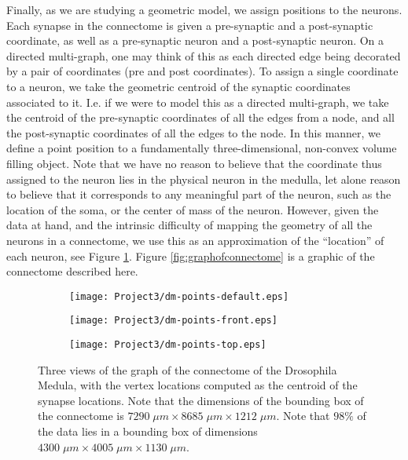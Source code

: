 \documentclass[11]{article}
\theoremstyle{remark}
\theoremstyle{definition}
\begin{document}
Finally, as we are studying a geometric model, we assign positions to the neurons. Each synapse in the connectome is given a pre-synaptic and a post-synaptic coordinate, as well as a pre-synaptic neuron and a post-synaptic neuron. On a directed multi-graph, one may think of this as each directed edge being decorated by a pair of coordinates (pre and post coordinates). To assign a single coordinate to a neuron, we take the geometric centroid of the synaptic coordinates associated to it. I.e. if we were to model this as a directed multi-graph, we take the centroid of the pre-synaptic coordinates of all the edges from a node, and all the post-synaptic coordinates of all the edges to the node. In this manner, we define a point position to a fundamentally three-dimensional, non-convex volume filling object. Note that we have no reason to believe that the coordinate thus assigned to the neuron lies in the physical neuron in the medulla, let alone reason to believe that it corresponds to any meaningful part of the neuron, such as the location of the soma, or the center of mass of the neuron. However, given the data at hand, and the intrinsic difficulty of mapping the geometry of all the neurons in a connectome, we use this as an approximation of the ``location'' of each neuron, see Figure \ref{fig:distributionofneurons}. Figure \ref{fig:graphofconnectome} is a graphic of the connectome described here. 


\begin{figure} [h]
  \centering
  \begin{subfigure}[b]{0.3\linewidth}
    \texttt{[image: Project3/dm-points-default.eps]}
  \end{subfigure}
  \begin{subfigure}[b]{0.3\linewidth}
    \texttt{[image: Project3/dm-points-front.eps]}
  \end{subfigure}
  \begin{subfigure}[b]{0.3\linewidth}
    \texttt{[image: Project3/dm-points-top.eps]}
  \end{subfigure}
  \caption{Three views of the graph of the connectome of the Drosophila Medula, with the vertex locations computed as the centroid of the synapse locations. Note that the dimensions of the bounding box of the connectome is $7290 \; \mu m \times 8685 \; \mu m \times 1212 \; \mu m$. Note that $98\%$ of the data lies in a bounding box of dimensions $4300 \; \mu m \times 4005 \; \mu m \times 1130 \; \mu m$.  } 
  \label{fig:distributionofneurons}
\end{figure}
\end{document}

